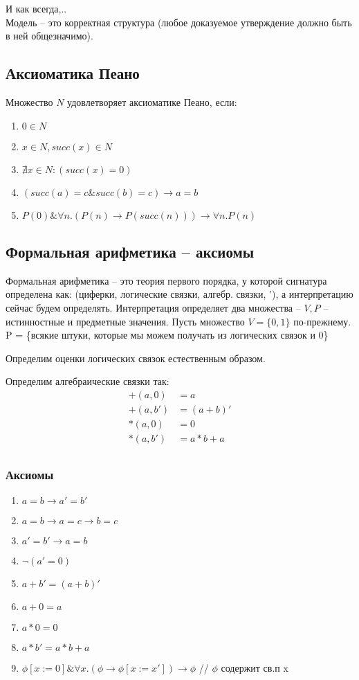 И как всегда,..\\
Модель – это корректная структура (любое доказуемое утверждение должно
быть в ней общезначимо).
\subsection{Аксиоматика Пеано}
\label{sec-2-19}
Множество $N$ удовлетворяет аксиоматике Пеано, если:
\begin{enumerate}
\item $0 \in N$
\item $x \in N, succ(x) \in N$
\item $\nexists x \in N : (succ(x) = 0)$
\item $(succ(a) = c \& succ(b) = c) \to a = b$
\item $P(0) \& \forall n.(P(n) \to P(succ(n))) \to \forall n.P(n)$
\end{enumerate}
\subsection{Формальная арифметика -- аксиомы}
\label{sec-2-20}
Формальная арифметика -- это теория первого порядка, у которой
сигнатура определена как: (циферки, логические связки, алгебр.
связки, '), а интерпретацию сейчас будем определять.
Интерпретация определяет два множества -- $V, P$ -- истинностные и
предметные значения. Пусть множество $V = \lbrace 0, 1 \rbrace$ по-прежнему.
P = \{всякие штуки, которые мы можем получать из логических связок и 0\}

Определим оценки логических связок естественным образом.

Определим алгебраические связки так:
\begin{align*}
    +(a, 0) &= a \\
    +(a, b')& = (a + b)' \\
    *(a, 0) &= 0 \\
    *(a, b')& = a * b + a \\
\end{align*}
\subsubsection{Аксиомы}
\label{sec-2-20-1}
\begin{enumerate}
\item $a = b \to a' = b'$
\item $a = b \to a = c \to b = c$
\item $a' = b' \to a = b$
\item $\lnot (a' = 0)$
\item $a + b' = (a + b)'$
\item $a + 0 = a$
\item $a * 0 = 0$
\item $a * b' = a * b + a$
\item $\phi[x:=0] \& \forall x.(\phi \to \phi[x:=x']) \to \phi$ // $\phi$ содержит св.п x
\end{enumerate}
